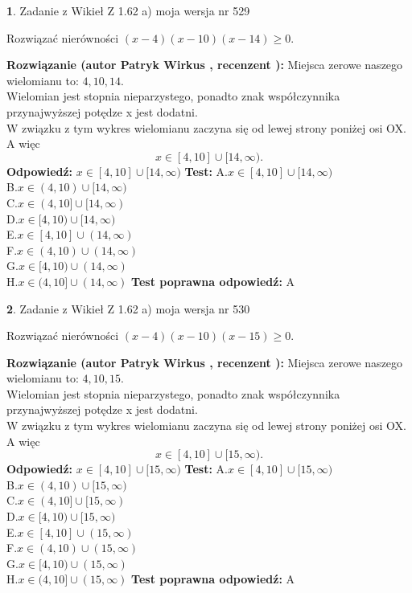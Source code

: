 \documentclass[12pt, a4paper]{article}
\theoremstyle{definition} %
\newtheorem{zad}{}
\newcommand{\zadStart}[1]{\begin{zad}#1\newline}
\newcommand{\zadStop}{\end{zad}}
\newcommand{\rozwStart}[2]{\noindent \textbf{Rozwiązanie (autor #1 , recenzent #2): }\newline}
\newcommand{\rozwStop}{\newline}
\newcommand{\odpStart}{\noindent \textbf{Odpowiedź:}\newline}
\newcommand{\odpStop}{\newline}
\newcommand{\testStart}{\noindent \textbf{Test:}\newline}
\newcommand{\testStop}{\newline}
\newcommand{\kluczStart}{\noindent \textbf{Test poprawna odpowiedź:}\newline}
\newcommand{\kluczStop}{\newline}
\begin{document}
\zadStart{Zadanie z Wikieł Z 1.62 a) moja wersja nr 529}

Rozwiązać nierówności $(x-4)(x-10)(x-14)\ge0$.
\zadStop
\rozwStart{Patryk Wirkus}{}
Miejsca zerowe naszego wielomianu to: $4, 10, 14$.\\
Wielomian jest stopnia nieparzystego, ponadto znak współczynnika przy\linebreak najwyższej potędze x jest dodatni.\\ W związku z tym wykres wielomianu zaczyna się od lewej strony poniżej osi OX. A więc $$x \in [4,10] \cup [14,\infty).$$
\rozwStop
\odpStart
$x \in [4,10] \cup [14,\infty)$
\odpStop
\testStart
A.$x \in [4,10] \cup [14,\infty)$\\
B.$x \in (4,10) \cup [14,\infty)$\\
C.$x \in (4,10] \cup [14,\infty)$\\
D.$x \in [4,10) \cup [14,\infty)$\\
E.$x \in [4,10] \cup (14,\infty)$\\
F.$x \in (4,10) \cup (14,\infty)$\\
G.$x \in [4,10) \cup (14,\infty)$\\
H.$x \in (4,10] \cup (14,\infty)$
\testStop
\kluczStart
A
\kluczStop



\zadStart{Zadanie z Wikieł Z 1.62 a) moja wersja nr 530}

Rozwiązać nierówności $(x-4)(x-10)(x-15)\ge0$.
\zadStop
\rozwStart{Patryk Wirkus}{}
Miejsca zerowe naszego wielomianu to: $4, 10, 15$.\\
Wielomian jest stopnia nieparzystego, ponadto znak współczynnika przy\linebreak najwyższej potędze x jest dodatni.\\ W związku z tym wykres wielomianu zaczyna się od lewej strony poniżej osi OX. A więc $$x \in [4,10] \cup [15,\infty).$$
\rozwStop
\odpStart
$x \in [4,10] \cup [15,\infty)$
\odpStop
\testStart
A.$x \in [4,10] \cup [15,\infty)$\\
B.$x \in (4,10) \cup [15,\infty)$\\
C.$x \in (4,10] \cup [15,\infty)$\\
D.$x \in [4,10) \cup [15,\infty)$\\
E.$x \in [4,10] \cup (15,\infty)$\\
F.$x \in (4,10) \cup (15,\infty)$\\
G.$x \in [4,10) \cup (15,\infty)$\\
H.$x \in (4,10] \cup (15,\infty)$
\testStop
\kluczStart
A
\kluczStop
\end{document}
